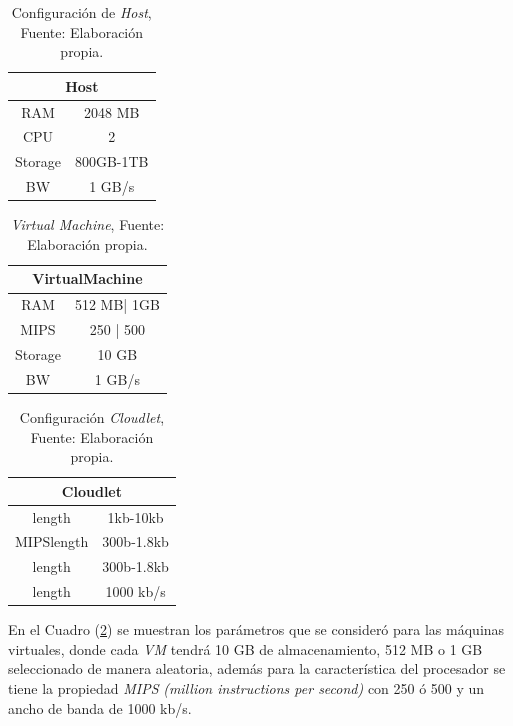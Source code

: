 \setcounter{table}{1}
\renewcommand\thetable{\arabic{table}}
\begin{table}[h!]
	\centering
	\begin{tabular}{@{}cc@{}}
		\toprule
		\multicolumn{2}{c}{{\bf Host}} \\ \midrule
		RAM           & 2048 MB        \\
		CPU           & 2              \\
		Storage       & 800GB-1TB      \\ \midrule
		BW            & 1 GB/s        
	\end{tabular}
	\caption{Configuraci\'on de \textit{Host}, Fuente: Elaboraci\'on propia.}
	\label{tab:host}
\end{table}

\newpage

\setcounter{table}{2}
\renewcommand\thetable{\arabic{table}}
\begin{table}[h!]
	\centering
	\begin{tabular}{@{}cc@{}}
		\toprule
		\multicolumn{2}{c}{{\bf VirtualMachine}} \\ \midrule
		RAM               & 512 MB| 1GB          \\
		MIPS              & 250 | 500            \\
		Storage           & 10 GB                \\ \midrule
		BW                & 1 GB/s              
	\end{tabular}
	\caption{\textit{Virtual Machine}, Fuente: Elaboraci\'on propia.}
	\label{tab:machine}
\end{table}


\setcounter{table}{3}
\renewcommand\thetable{\arabic{table}}
\begin{table}[h!]
	\centering
	\begin{tabular}{@{}cc@{}}
		\toprule
		\multicolumn{2}{c}{{\bf Cloudlet}} \\ \midrule
		length           & 1kb-10kb        \\
		MIPSlength       & 300b-1.8kb      \\
		length           & 300b-1.8kb      \\ \midrule
		length           & 1000 kb/s      
	\end{tabular}
	\caption{Configuraci\'on \textit{Cloudlet}, Fuente: Elaboraci\'on propia.}
	\label{tab:cloudlet}
\end{table}


En el Cuadro (\ref{tab:machine}) se muestran los par\'ametros que se consider\'o para las m\'aquinas virtuales, donde cada \textit{VM} tendr\'a 10 GB de almacenamiento, 512 MB  o 1 GB seleccionado de manera aleatoria, adem\'as para la caracter\'istica del procesador se tiene  la propiedad \textit{MIPS} \textit{(million instructions per second)} con 250 \'o 500 y un ancho de banda de 1000 kb/s.

